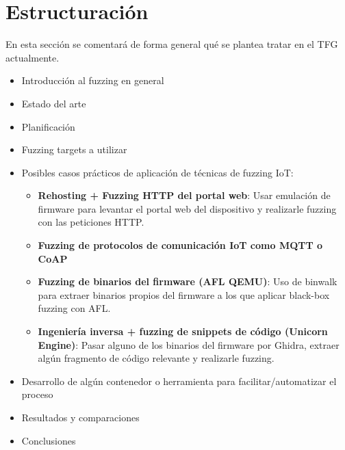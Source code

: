 \documentclass[11pt, a4paper, openany]{report}
\begin{document}
    \section{Estructuración}
    En esta sección se comentará de forma general qué se plantea tratar en el TFG actualmente.
    
    \begin{itemize}
        \item Introducción al fuzzing en general
        \item Estado del arte
        \item Planificación
        \item Fuzzing targets a utilizar
        \item Posibles casos prácticos de aplicación de técnicas de fuzzing IoT:
        \begin{itemize}
            \item \textbf{Rehosting + Fuzzing HTTP del portal web}: Usar emulación de firmware
            para levantar el portal web del dispositivo y realizarle fuzzing con las peticiones HTTP.
            \item \textbf{Fuzzing de protocolos de comunicación IoT como MQTT o CoAP}
            \item \textbf{Fuzzing de binarios del firmware (AFL QEMU)}: Uso de binwalk para extraer
            binarios propios del firmware a los que aplicar black-box fuzzing con AFL.
            \item \textbf{Ingeniería inversa + fuzzing de snippets de código (Unicorn Engine)}:
            Pasar alguno de los binarios del firmware por Ghidra, extraer algún fragmento de código
            relevante y realizarle fuzzing.
        \end{itemize}
        \item Desarrollo de algún contenedor o herramienta para facilitar/automatizar el proceso
        \item Resultados y comparaciones
        \item Conclusiones
    \end{itemize}
\end{document}
